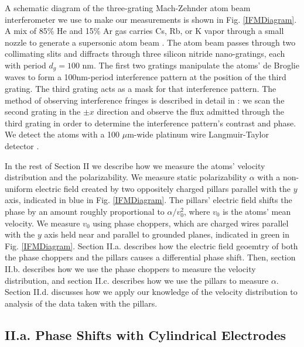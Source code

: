 \documentclass[twocolumn,prl,showpacs,superscriptaddress]{revtex4-1}   %
\newcommand{\figref}[1]{Fig. \ref{#1}}
\begin{document}
A schematic diagram of the three-grating Mach-Zehnder atom beam interferometer we use to make our measurements is shown in \figref{IFMDiagram}. 
A mix of 85\% He and 15\% Ar gas carries Cs, Rb, or K vapor through a small nozzle to generate a supersonic atom beam \cite{Scoles} \cite{Ekstrom1993}. 
The atom beam passes through two collimating slits and diffracts through three silicon nitride nano-gratings, each with period $d_g = 100$ nm.
The first two gratings manipulate the atoms' de Broglie waves to form a 100nm-period interference pattern at the position of the third grating. 
The third grating acts as a mask for that interference pattern. 
The method of observing interference fringes is described in detail in \cite{Kokorowski2001}: we scan the second grating in the $\pm x$ direction and observe the flux admitted through the third grating in order to determine the interference pattern's contrast and phase.
We detect the atoms with a 100 $\mu$m-wide platinum wire Langmuir-Taylor detector \cite{Delhuille2002}.

In the rest of Section II we describe how we measure the atoms' velocity distribution and the polarizability.
We measure static polarizability $\alpha$ with a non-uniform electric field created by two oppositely charged pillars parallel with the $y$ axis, indicated in blue in \figref{IFMDiagram}. The pillars' electric field shifts the phase by an amount roughly proportional to $\alpha/v_0^2$, where $v_0$ is the atoms' mean velocity. We measure $v_0$ using phase choppers, which are charged wires parallel with the $y$ axis held near and parallel to grounded planes, indicated in green in \figref{IFMDiagram}.
Section II.a. describes how the electric field geoemtry of both the phase choppers and the pillars causes a differential phase shift. Then, section II.b. describes how we use the phase choppers to measure the velocity distribution, and section II.c. describes how we use the pillars to measure $\alpha$. Section II.d. discusses how we apply our knowledge of the velocity distribution to analysis of the data taken with the pillars.


\subsection{II.a. Phase Shifts with Cylindrical Electrodes}
\end{document}
